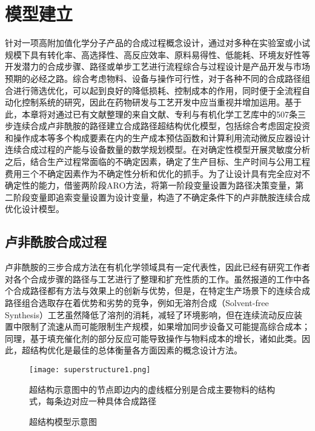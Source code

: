 
\chapter{模型建立}

针对一项高附加值化学分子产品的合成过程概念设计，通过对多种在实验室或小试规模下具有转化率、高选择性、高反应效率、原料易得性、低能耗、环境友好性等开发潜力的合成步骤、路径或单步工艺进行流程综合与过程设计是产品开发与市场预期的必经之路。综合考虑物料、设备与操作可行性，对于各种不同的合成路径组合进行筛选优化，可以起到良好的降低损耗、控制成本的作用，同时便于全流程自动化控制系统的研究，因此在药物研发与工艺开发中应当重视并增加运用\cite{mencarelli2020,matsunami2020}。基于此，本章将对通过已有文献整理的来自文献、专利与有机化学工艺库中的507条三步连续合成卢非酰胺的路径建立合成路径超结构优化模型，包括综合考虑固定投资和操作成本等多个构成要素在内的生产成本预估函数和计算利用流动微反应器设计连续合成过程的产能与设备数量的数学规划模型。在对确定性模型开展灵敏度分析之后，结合生产过程常面临的不确定因素，确定了生产目标、生产时间与公用工程费用三个不确定因素作为不确定性分析和优化的抓手。为了让设计具有完全应对不确定性的能力，借鉴两阶段ARO方法，将第一阶段变量设置为路径决策变量，第二阶段变量即追索变量设置为设计变量，构造了不确定条件下的卢非酰胺连续合成优化设计模型。

\section{卢非酰胺合成过程}

卢非酰胺的三步合成方法在有机化学领域具有一定代表性，因此已经有研究工作者对各个合成步骤的路径与工艺进行了整理和扩充性质的工作\cite{padmaja2018}。虽然报道的工作中各个合成路径都有方法与效果上的创新与优势，但是，在特定生产场景下的连续合成路径组合选取存在着优势和劣势的竞争，例如无溶剂合成（Solvent-free Synthesis）工艺虽然降低了溶剂的消耗，减轻了环境影响，但在连续流动反应装置中限制了流速从而可能限制生产规模，如果增加同步设备又可能提高综合成本\cite{gelonch2019}；同理，基于填充催化剂的部分反应可能导致操作与物料成本的增长，诸如此类。因此，超结构优化是最佳的总体衡量各方面因素的概念设计方法。

\begin{figure}
  \centering
  \texttt{[image: superstructure1.png]}
  \caption*{超结构示意图中的节点即边内的虚线框分别是合成主要物料的结构式，每条边对应一种具体合成路径}
  \caption{超结构模型示意图}
  \label{fig:superstructure}
\end{figure}

